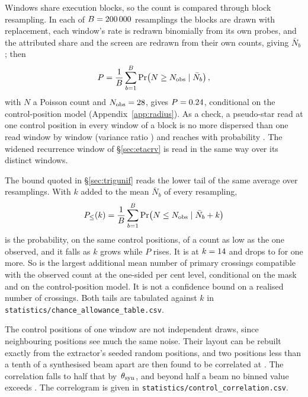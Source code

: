 Windows share execution blocks, so the count is compared through block
resampling. In each of $B=200\,000$ resamplings the blocks are drawn with
replacement, each window's rate is redrawn binomially from its own probes,
and the attributed share and the screen are redrawn from their own counts,
giving $\bar N_b$; then
\begin{equation*}
P=\frac{1}{B}\sum_{b=1}^{B}\Pr\!\left(N\ge N_{\rm obs}\mid\bar N_b\right),
\end{equation*}
with $N$ a Poisson count and $N_{\rm obs}=28$, gives $P=0.24$,
conditional on the control-position model (Appendix~\ref{app:radius}). As
a check, a pseudo-star read at one control position in every window of
a block is no more dispersed than one read window by window (variance ratio
\BgDisp) and reaches \CeObs{} with probability \BgPseudoP. The widened recurrence window
of \S\ref{sec:etacrv} is read in the same way over its \WuNWin{} distinct
windows.

The bound quoted in \S\ref{sec:trigunif} reads the lower tail of the same
average over resamplings. With $k$ added to the mean $\bar N_b$ of every resampling,
\begin{equation*}
P_{\le}(k)=\frac{1}{B}\sum_{b=1}^{B}\Pr\!\left(N\le N_{\rm obs}\mid\bar N_b+k\right)
\end{equation*}
is the probability, on the same control positions, of a count as low as the
one observed, and it falls as $k$ grows while $P$ rises. It is
\CeProbAtLim{} at $k=14$ and drops to \CeProbAboveLim{} for one more.
So \CeAddLim{} is the largest additional mean number of primary crossings
compatible with the observed count at the one-sided \CeAlphaPct{} per cent
level, conditional on the mask and on the control-position model. It is not
a confidence bound on a realised number of crossings. Both tails are
tabulated against $k$ in
\texttt{statistics/\allowbreak chance\_allowance\_table.csv}.

The control positions of one window are not independent draws, since
neighbouring positions see much the same noise. Their layout can be rebuilt
exactly from the extractor's seeded random positions, and two positions
less than a tenth of a synthesised beam apart are then found to be
correlated at \CcRhoNear. The correlation falls to half that by
\CcHalfBeam\,$\theta_{\rm syn}$, and beyond half a beam no binned value
exceeds \CcRhoHalfBeamOut. The correlogram is given in
\texttt{statistics/\allowbreak control\_correlation.csv}.

